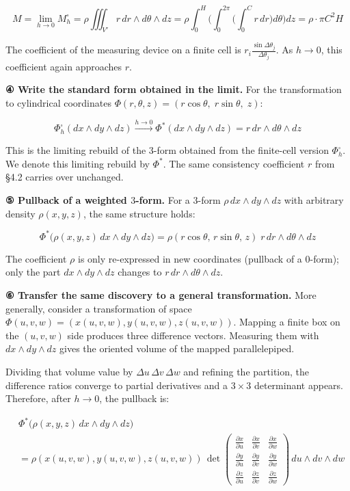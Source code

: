 \documentclass[a4paper,12pt,openany]{book}
\begin{document}
\[
M
=
\lim_{h\to0} M_h^\square
=
\rho\iiint_{V'} r\,dr\wedge d\theta\wedge dz
=
\rho
\int_0^H
\biggl(
  \int_0^{2\pi}
  \biggl(
    \int_0^C r\,dr
  \biggr)
  d\theta
\biggr)
dz
=
\rho\cdot\pi C^2H
\]

The coefficient of the measuring device on a finite cell is
\(r_i\frac{\sin\Delta\theta_j}{\Delta\theta_j}\). As \(h\to0\), this
coefficient again approaches \(r\).

\textbf{④ Write the standard form obtained in the limit.} For the
transformation to cylindrical coordinates
\(\Phi(r,\theta,z) = (r\cos\theta,\; r\sin\theta,\; z)\):

\[
\Phi_h^\square(dx\wedge dy\wedge dz)
\xrightarrow{h\to0}
\Phi^*(dx \wedge dy \wedge dz)
=
r\,dr \wedge d\theta \wedge dz
\]

This is the limiting rebuild of the \(3\)-form obtained from the
finite-cell version \(\Phi_h^\square\). We denote this limiting rebuild
by \(\Phi^*\). The same consistency coefficient \(r\) from §4.2 carries
over unchanged.

\textbf{⑤ Pullback of a weighted $3$-form.} For a \(3\)-form
\(\rho\,dx \wedge dy \wedge dz\) with arbitrary density \(\rho(x,y,z)\),
the same structure holds:

\[\Phi^*\bigl(\rho(x,y,z)\,dx \wedge dy \wedge dz\bigr) = \rho(r\cos\theta,\, r\sin\theta,\, z)\; r\,dr \wedge d\theta \wedge dz\]

The coefficient \(\rho\) is only re-expressed in new coordinates
(pullback of a \(0\)-form); only the part \(dx \wedge dy \wedge dz\)
changes to \(r\,dr \wedge d\theta \wedge dz\).

\textbf{⑥ Transfer the same discovery to a general transformation.} More
generally, consider a transformation of space
\(\Phi(u,v,w) = (x(u,v,w), y(u,v,w), z(u,v,w))\). Mapping a finite box
on the \((u,v,w)\) side produces three difference vectors. Measuring
them with \(dx\wedge dy\wedge dz\) gives the oriented volume of the
mapped parallelepiped.

Dividing that volume value by \(\Delta u\,\Delta v\,\Delta w\) and
refining the partition, the difference ratios converge to partial
derivatives and a \(3\times3\) determinant appears. Therefore, after
\(h\to0\), the pullback is:

\[
\begin{aligned}
&\Phi^*\bigl(\rho(x,y,z)\,dx \wedge dy \wedge dz\bigr) \\
&= \rho(x(u,v,w), y(u,v,w), z(u,v,w))\,
\det\!\begin{pmatrix}
\frac{\partial x}{\partial u} & \frac{\partial x}{\partial v} & \frac{\partial x}{\partial w} \\[6pt]
\frac{\partial y}{\partial u} & \frac{\partial y}{\partial v} & \frac{\partial y}{\partial w} \\[6pt]
\frac{\partial z}{\partial u} & \frac{\partial z}{\partial v} & \frac{\partial z}{\partial w}
\end{pmatrix}
\,du \wedge dv \wedge dw
\end{aligned}
\]
\end{document}

